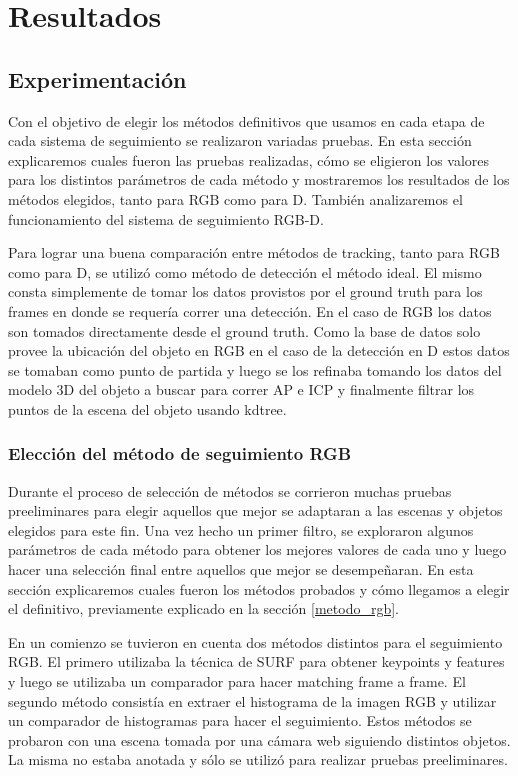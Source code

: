 \chapter{Resultados}

\section{Experimentación}
Con el objetivo de elegir los métodos definitivos que usamos en cada etapa de cada sistema de seguimiento se realizaron variadas pruebas. En esta sección explicaremos cuales fueron las pruebas realizadas, cómo se eligieron los valores para los distintos parámetros de cada método y mostraremos los resultados de los métodos elegidos, tanto para RGB como para D. También analizaremos el funcionamiento del sistema de seguimiento RGB-D.

Para lograr una buena comparación entre métodos de tracking, tanto para RGB como para D, se utilizó como método de detección el método ideal. El mismo consta simplemente de tomar los datos provistos por el ground truth para los frames en donde se requería correr una detección. En el caso de RGB los datos son tomados directamente desde el ground truth. Como la base de datos solo provee la ubicación del objeto en RGB en el caso de la detección en D estos datos se tomaban como punto de partida y luego se los refinaba tomando los datos del modelo 3D del objeto a buscar para correr AP e ICP y finalmente filtrar los puntos de la escena del objeto usando kdtree.

\subsection{Elección del método de seguimiento RGB}
Durante el proceso de selección de métodos se corrieron muchas pruebas preeliminares para elegir aquellos que mejor se adaptaran a las escenas y objetos elegidos para este fin. Una vez hecho un primer filtro, se exploraron algunos parámetros de cada método para obtener los mejores valores de cada uno y luego hacer una selección final entre aquellos que mejor se desempeñaran. En esta sección explicaremos cuales fueron los métodos probados y cómo llegamos a elegir el definitivo, previamente explicado en la sección \ref{metodo_rgb}.

En un comienzo se tuvieron en cuenta dos métodos distintos para el seguimiento RGB. El primero utilizaba la técnica de SURF para obtener keypoints y features y luego se utilizaba un comparador para hacer matching frame a frame. El segundo método consistía en extraer el histograma de la imagen RGB y utilizar un comparador de histogramas para hacer el seguimiento. Estos métodos se probaron con una escena tomada por una cámara web siguiendo distintos objetos. La misma no estaba anotada y sólo se utilizó para realizar pruebas preeliminares.

